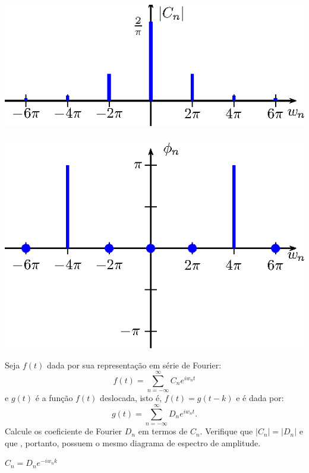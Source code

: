 \begin{resp}
\begin{itemize}
\includegraphics{cap_diagramas_espectro/pics/figura_23}~\includegraphics{cap_diagramas_espectro/pics/figura_24}

\end{itemize}
\end{resp}

\begin{exer} Seja $f(t)$ dada por sua representação em série de Fourier:
  $$f(t)=\sum_{n=-\infty}^\infty C_n e^{iw_n t }$$
e  $g(t)$ é a função $f(t)$ deslocada, isto é, $f(t)=g(t-k)$ e é dada por:
$$g(t)=\sum_{n=-\infty}^\infty D_n e ^{iw_n t }.$$
  Calcule os coeficiente de Fourier $D_n$ em termos de $C_n$. Verifique que $|C_n|=|D_n|$ e que , portanto, possuem o mesmo diagrama de espectro de amplitude.
\end{exer}
\begin{resp}
  $C_n = D_n e^{-iw_n k}$
\end{resp}